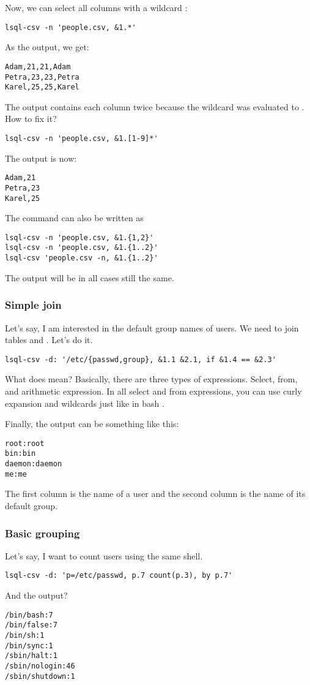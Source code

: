 Now, we can select all columns with a wildcard :
\begin{verbatim}
lsql-csv -n 'people.csv, &1.*'
\end{verbatim}
As the output, we get:
\begin{verbatim}
Adam,21,21,Adam
Petra,23,23,Petra
Karel,25,25,Karel
\end{verbatim}

The output contains each column twice because the wildcard  was evaluated to .
How to fix it?
\begin{verbatim}
lsql-csv -n 'people.csv, &1.[1-9]*'
\end{verbatim}
The output is now:
\begin{verbatim}
Adam,21
Petra,23
Karel,25
\end{verbatim}

The command can also be written as
\begin{verbatim}
lsql-csv -n 'people.csv, &1.{1,2}'
lsql-csv -n 'people.csv, &1.{1..2}'
lsql-csv 'people.csv -n, &1.{1..2}'
\end{verbatim}
The output will be in all cases still the same.


\subsubsection{Simple join}
Let's say, I am interested in the default group names of users. We need to join tables  and . Let's do it.
\begin{verbatim}
lsql-csv -d: '/etc/{passwd,group}, &1.1 &2.1, if &1.4 == &2.3'
\end{verbatim}
What does  mean? Basically, there are three types of expressions. Select, from, and arithmetic expression. 
In all select and from expressions, you can use curly expansion and wildcards just like in bash \cite{bash-reference-manual}.

Finally, the output can be something like this:
\begin{verbatim}
root:root
bin:bin
daemon:daemon
me:me
\end{verbatim}
The first column is the name of a user and the second column is the name of its default group.


\subsubsection{Basic grouping}
Let's say, I want to count users using the same shell.
\begin{verbatim}
lsql-csv -d: 'p=/etc/passwd, p.7 count(p.3), by p.7'
\end{verbatim}
And the output?
\begin{verbatim}
/bin/bash:7
/bin/false:7
/bin/sh:1
/bin/sync:1
/sbin/halt:1
/sbin/nologin:46
/sbin/shutdown:1
\end{verbatim}

